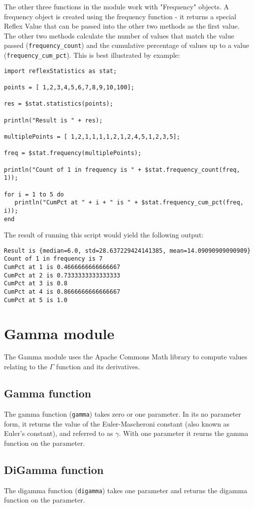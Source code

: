 The other three functions in the module work with "Frequency" objects. A frequency object is created using the frequency function - it returns a special Reflex Value that can be passed into the other two methods as the first value. The other two methods calculate the number of values that match the value passed (\Verb+frequency_count+) and the cumulative percentage of values up to a value (\verb+frequency_cum_pct+). This is best illustrated by example:

\begin{lstlisting}[caption={Statistics}]
import reflexStatistics as stat;

points = [ 1,2,3,4,5,6,7,8,9,10,100];

res = $stat.statistics(points);

println("Result is " + res);

multiplePoints = [ 1,2,1,1,1,1,2,1,2,4,5,1,2,3,5];

freq = $stat.frequency(multiplePoints);

println("Count of 1 in frequency is " + $stat.frequency_count(freq, 1));

for i = 1 to 5 do
   println("CumPct at " + i + " is " + $stat.frequency_cum_pct(freq, i));
end

\end{lstlisting}
 The result of running this script would yield the following output:
\begin{Verbatim}
Result is {median=6.0, std=28.637229424141385, mean=14.09090909090909}
Count of 1 in frequency is 7
CumPct at 1 is 0.4666666666666667
CumPct at 2 is 0.7333333333333333
CumPct at 3 is 0.8
CumPct at 4 is 0.8666666666666667
CumPct at 5 is 1.0
\end{Verbatim}
\section{Gamma module}
The Gamma module uses the Apache Commons Math library to compute values relating to the $\Gamma$ function and its derivatives.
\subsection{Gamma function}
The gamma function (\Verb+gamma+) takes zero or one parameter. In its no parameter form, it returns the value of the Euler-Mascheroni constant (also known as Euler's constant), and referred to as $\gamma$. With one parameter it reurns the gamma function on the parameter.
\subsection{DiGamma function}
The digamma function (\Verb+digamma+) takes one parameter and returns the digamma function on the parameter.
